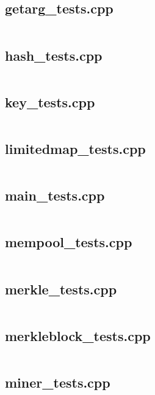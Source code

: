\documentclass{article}
\begin{document}
\subsection{getarg\_tests.cpp}
\inputminted{cpp}{/home/dufferzafar/dev/@clones/bitcoin/src/test/getarg_tests.cpp}
\newpage

\subsection{hash\_tests.cpp}
\inputminted{cpp}{/home/dufferzafar/dev/@clones/bitcoin/src/test/hash_tests.cpp}
\newpage

\subsection{key\_tests.cpp}
\inputminted{cpp}{/home/dufferzafar/dev/@clones/bitcoin/src/test/key_tests.cpp}
\newpage

\subsection{limitedmap\_tests.cpp}
\inputminted{cpp}{/home/dufferzafar/dev/@clones/bitcoin/src/test/limitedmap_tests.cpp}
\newpage

\subsection{main\_tests.cpp}
\inputminted{cpp}{/home/dufferzafar/dev/@clones/bitcoin/src/test/main_tests.cpp}
\newpage

\subsection{mempool\_tests.cpp}
\inputminted{cpp}{/home/dufferzafar/dev/@clones/bitcoin/src/test/mempool_tests.cpp}
\newpage

\subsection{merkle\_tests.cpp}
\inputminted{cpp}{/home/dufferzafar/dev/@clones/bitcoin/src/test/merkle_tests.cpp}
\newpage

\subsection{merkleblock\_tests.cpp}
\inputminted{cpp}{/home/dufferzafar/dev/@clones/bitcoin/src/test/merkleblock_tests.cpp}
\newpage

\subsection{miner\_tests.cpp}
\inputminted{cpp}{/home/dufferzafar/dev/@clones/bitcoin/src/test/miner_tests.cpp}
\newpage
\end{document}
